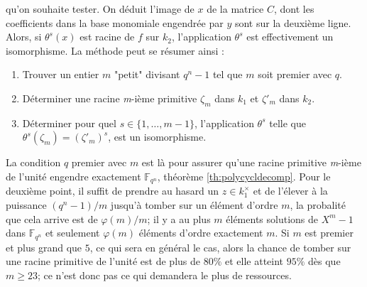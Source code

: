 \documentclass[a4paper]{article} %
\numberwithin{section}{part}
\numberwithin{equation}{section}
\newcommand\nroot[1]{\textit{#1}-ième}
\newcommand\GF[1]{\mathbb{F}_{#1}}
\begin{document}
qu'on souhaite tester. On déduit l'image de $x$ de la matrice $C$, dont les 
coefficients dans la base monomiale engendrée par $y$ sont sur la deuxième 
ligne. Alors, si $\theta^s(x)$ est racine de $f$ sur $k_2$, l'application 
$\theta^s$ est effectivement un isomorphisme. La méthode peut se résumer ainsi :
\vspace{0.3cm}
\begin{enumerate}[1.]
    \item Trouver un entier $m$ "petit" divisant $q^n - 1$ tel que 
    $m$ soit premier avec $q$. 

    \item Déterminer une racine \nroot{m} primitive $\zeta_m$ dans $k_1$ et
    $\zeta'_m$ dans $k_2$.

    \item  Déterminer pour quel $s\in \lbrace{1,\dots,m-1}\rbrace$, 
    l'application $\theta^s$ telle que $\theta^s(\zeta_m) = (\zeta'_m)^s$, est 
	un isomorphisme.
\end{enumerate}
\vspace{0.3cm}
La condition $q$ premier avec $m$ est là pour assurer qu'une racine primitive
\nroot{m} de l'unité engendre exactement $\GF{q^n}$, théorème
\ref{th:polycycldecomp}. Pour le deuxième point, il suffit de prendre au hasard 
un $z\in k_1^{\times}$ et de l'élever à la puissance $(q^n - 1)/m$ jusqu'à 
tomber sur un élément d'ordre $m$, la probalité que cela arrive est de 
$\varphi(m)/m$; il y a au plus $m$ éléments solutions de $X^m - 1$ dans 
$\GF{q^n}$ et seulement $\varphi(m)$ éléments d'ordre exactement $m$. Si $m$ est
premier et plus grand que $5$, ce qui sera en général le cas, alors la chance 
de tomber sur une racine primitive de l'unité est de plus de $80\%$ et elle 
atteint $95\%$ dès que $m \geq 23$; ce n'est donc pas ce qui demandera le plus
de ressources. 
\end{document}
